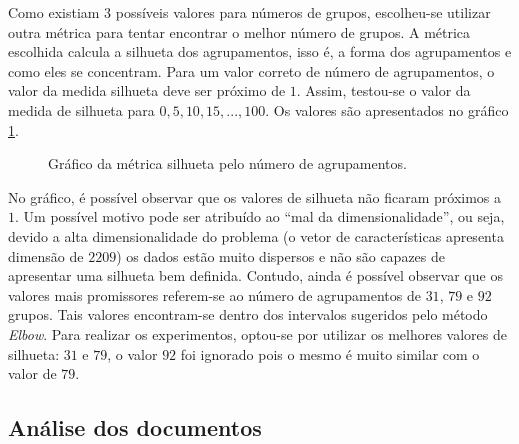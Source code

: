 \documentclass[conference]{IEEEtran}
\begin{document}
Como existiam 3 possíveis valores para números de grupos, escolheu-se utilizar outra métrica para tentar encontrar o melhor número de grupos. A métrica escolhida calcula a silhueta dos agrupamentos, isso é, a forma dos agrupamentos e como eles se concentram. Para um valor correto de número de agrupamentos, o valor da medida silhueta deve ser próximo de $1$. Assim, testou-se o valor da medida de silhueta para $0, 5, 10, 15, ..., 100$. Os valores são apresentados no gráfico \ref{fig:silhueta}.

\begin{figure}[!h]
	\centering
	{
	}
	\caption{\small Gráfico da métrica silhueta pelo número de agrupamentos.}
	\label{fig:silhueta}
\end{figure}

No gráfico, é possível observar que os valores de silhueta não ficaram próximos a $1$. Um possível motivo pode ser atribuído ao ``mal da dimensionalidade'', ou seja, devido a alta dimensionalidade do problema (o vetor de características apresenta dimensão de $2209$) os dados estão muito dispersos e não são capazes de apresentar uma silhueta bem definida. Contudo, ainda é possível observar que os valores mais promissores referem-se ao número de agrupamentos de $31$, $79$ e $92$ grupos. Tais valores encontram-se dentro dos intervalos sugeridos pelo método \textit{Elbow}. Para realizar os experimentos, optou-se por utilizar os melhores valores de silhueta: $31$ e $79$, o valor $92$ foi ignorado pois o mesmo é muito similar com o valor de $79$.


\subsection{Análise dos documentos}
\end{document}
